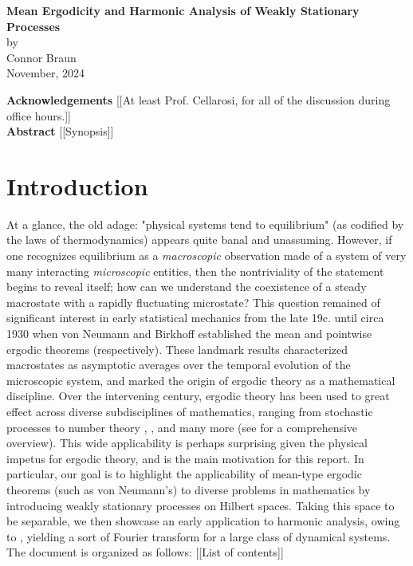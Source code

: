 \documentclass[11pt]{report}
\theoremstyle{definition}
\begin{document}
\thispagestyle{empty}
    \begin{center}
        {\bf\large{Mean Ergodicity and Harmonic Analysis of Weakly Stationary
        Processes}}\\[5pt]
        by\\[5pt]
        Connor Braun\\[5pt]
        November, 2024
    \end{center}
    \vspace{5pt}
    \textbf{Acknowledgements} [[At least Prof. Cellarosi, for all of the discussion during office hours.]]\\[5pt]
    \textbf{Abstract} [[Synopsis]]
    \section{Introduction}\label{sec0} At a glance, the old adage: "physical systems tend to
    equilibrium" (as codified by the laws of thermodynamics) appears quite banal
    and unassuming. However, if one recognizes equilibrium as a
    \textit{macroscopic} observation made of a system of very many interacting
    \textit{microscopic} entities, then the nontriviality of the statement
    begins to reveal itself; how can we understand the coexistence of a steady
    macrostate with a rapidly fluctuating microstate? This question remained of
    significant interest in early statistical mechanics from the late 19c. until
    circa 1930 when von Neumann \cite{Neumann_1932} and Birkhoff
    \cite{Birkhoff_1931} established the mean and pointwise ergodic theorems
    (respectively). These landmark results characterized macrostates as
    asymptotic averages over the temporal evolution of the microscopic system,
    and marked the origin of ergodic theory as a mathematical discipline. Over
    the intervening century, ergodic theory has been used to great effect across
    diverse subdisciplines of mathematics, ranging from stochastic processes
    \cite[theorem 17.0.1]{Meyn_Tweedie_1993} to number theory
    \cite{Furstenberg_1977}, \cite{Gorodnik_Nevo_2015}, \cite{Green_Tao_2008}
    and many more (see \cite{Eisner_Farkas_Haase_Nagel_2015} for a comprehensive
    overview). This wide applicability is perhaps surprising given the physical
    impetus for ergodic theory, and is the main motivation for this report. In
    particular, our goal is to highlight the applicability of mean-type ergodic
    theorems (such as von Neumann's) to diverse problems in mathematics by
    introducing weakly stationary processes on Hilbert spaces. Taking this
    space to be separable, we then showcase an early application to harmonic
    analysis, owing to \cite{Fan_1946}, yielding a sort of Fourier transform for
    a large class of dynamical systems.\\[5pt]
    \indent The document is organized as follows: [[List of contents]]
\end{document}
